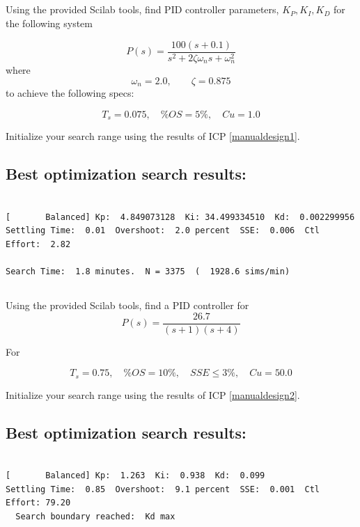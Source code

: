 \documentclass{article}	%
\begin{document}
\subsection{}
Using the provided Scilab tools, find PID controller parameters, $K_P, K_I, K_D$ for the following system

\[
P(s) = \frac  {100(s+0.1)}   {s^2+2\zeta\omega_ns + \omega_n^2}
\]
where
\[
\omega_n = 2.0, \qquad \zeta = 0.875
\]
to achieve the following specs:

\[
T_s = 0.075, \quad \%OS = 5\%, \quad Cu = 1.0
\]

Initialize your search range using the results of ICP \ref{manualdesign1}.

\begin{solution}

\subsection*{Best optimization search results:}
\begin{verbatim}

[       Balanced] Kp:  4.849073128  Ki: 34.499334510  Kd:  0.002299956
Settling Time:  0.01  Overshoot:  2.0 percent  SSE:  0.006  Ctl Effort:  2.82

Search Time:  1.8 minutes.  N = 3375  (  1928.6 sims/min)

\end{verbatim}

\end{solution}




\subsection{}


Using the provided Scilab tools, find a PID controller for
\[
P(s) = \frac  {26.7}{(s+1)(s+4)}
\]

For

\[
T_s = 0.75, \quad \%OS = 10\%,\quad SSE \leq 3\%, \quad Cu = 50.0
\]

Initialize your search range using the results of ICP \ref{manualdesign2}.

\begin{solution}

\subsection*{Best optimization search results:}
\begin{verbatim}

[       Balanced] Kp:  1.263  Ki:  0.938  Kd:  0.099
Settling Time:  0.85  Overshoot:  9.1 percent  SSE:  0.001  Ctl Effort: 79.20
  Search boundary reached:  Kd max
\end{verbatim}

\end{solution}
\end{document}

